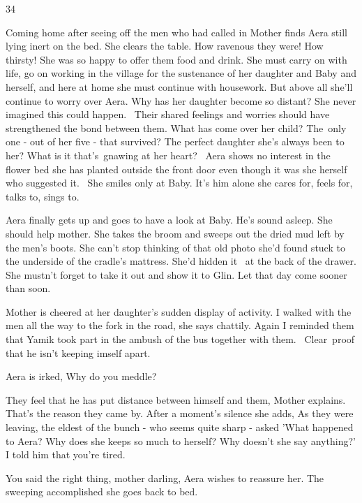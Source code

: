 \documentclass[12pt]{book}
\begin{document}
\bigskip

34

Coming home after seeing off the men who had called in Mother finds Aera still lying inert on the bed. She clears the
table. How ravenous they were! How thirsty! She was so happy to offer them food and drink. She must carry on with life,
go on working in the village for the sustenance of her daughter and Baby\textbf{ }and herself, and here at home she
must continue with housework.{ }But above all she'll continue to worry over Aera. Why has her daughter
become so distant? She never imagined this could happen. ~Their shared feelings and worries should have strengthened
the bond between them. What has come over her child? The~only one - out of her five - that survived? The perfect
daughter she's always been to her? What is it that's~gnawing at her heart? ~Aera shows no interest in the flower bed
she has planted outside the front door even though it was she herself who suggested it. ~She smiles only at Baby. It's
him alone she cares for, feels for, talks to, sings to.

Aera finally gets up and goes to have a look at Baby. He's sound asleep. She should help mother. She takes the broom and
sweeps out the dried mud left by the men's boots. She can't stop thinking of that old photo she'd found stuck
to{ }the underside of the cradle's mattress. She'd hidden it \ at the back of the drawer. She mustn't
forget to take it out and show it to Glin. Let that day come sooner than soon.

Mother is cheered at her daughter's sudden display of activity. {\textquotedbl}I walked with the men all the way to the
fork in the road,{\textquotedbl} she says chattily. {\textquotedbl}Again I reminded them that Yamik took part in the
ambush of the bus together with them. \ Clear~proof that he isn't keeping imself apart.{\textquotedbl}

Aera is irked, {\textquotedbl}Why do you meddle?{\textquotedbl}

{\textquotedbl}They feel that he has put distance between himself and them,{\textquotedbl} Mother explains.
{\textquotedbl}That's the reason they came by.{\textquotedbl} After a moment's silence she adds, {\textquotedbl}As they
were leaving, the eldest of the bunch - who seems quite sharp - asked 'What happened to Aera? Why does she keeps so
much to herself? Why doesn't she say anything?' I told him that you're tired.{\textquotedbl}

{\textquotedbl}You said the right thing, mother darling,{\textquotedbl} Aera wishes to reassure her. The sweeping
accomplished she goes back to bed.
\end{document}
